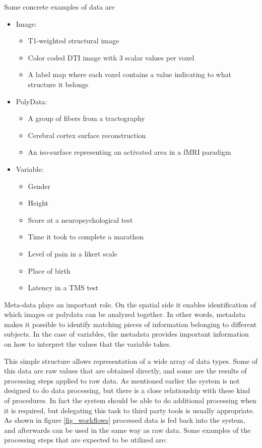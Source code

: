 Some concrete examples of data are
\begin{itemize}
\item Image:
\begin{itemize}
\item T1-weighted structural image
\item Color coded DTI image with 3 scalar values per voxel
\item A label map where each voxel contains a value indicating to what structure it belongs 
\end{itemize}
\item PolyData:
\begin{itemize}
\item A group of fibers from a tractography
\item Cerebral cortex surface reconstruction
\item An iso-surface representing an activated area in a fMRI paradigm
\end{itemize}
\item Variable:
\begin{itemize}
\item Gender
\item Height
\item Score at a neuropsychological test
\item Time it took to complete a marathon
\item Level of pain in a likert scale
\item Place of birth
\item Latency in a TMS test
\end{itemize}
\end{itemize}

Meta-data plays an important role. On the spatial side it enables identification of which images or polydata can be analyzed together. In other words, metadata makes it possible to identify matching pieces of information belonging to different subjects. In the case of variables, the metadata provides important information on how to interpret the values that the variable takes. 

This simple structure allows representation of a wide array of data types. Some of this data are raw values that are obtained directly, and some are the results of processing steps applied to raw data. As mentioned earlier the system is not designed to do data processing, but there is a close relationship with these kind of procedures. In fact the system should be able to do additional processing when it is required, but delegating this task to third party tools is usually appropriate. As shown in figure \ref{fig_workflows} processed data is fed back into the system, and afterwards can be used in the same way as raw data. Some examples of the processing steps that are expected to be utilized are:

